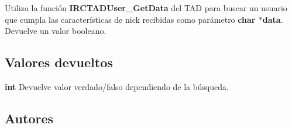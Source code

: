 Utiliza la función {\bfseries I\+R\+C\+T\+A\+D\+User\+\_\+\+Get\+Data} del T\+AD para buscar un usuario que cumpla las características de nick recibidas como parámetro {\bfseries char $\ast$data}. Devuelve un valor booleano.\hypertarget{server_users_find_by_nick_return_server_users_find_by_nick}{}\subsection{Valores devueltos}\label{server_users_find_by_nick_return_server_users_find_by_nick}

\begin{DoxyItemize}
\item {\bfseries int} Devuelve valor verdado/falso dependiendo de la búsqueda. 
\end{DoxyItemize}\hypertarget{server_users_find_by_nick_authors_server_users_find_by_nick}{}\subsection{Autores}\label{server_users_find_by_nick_authors_server_users_find_by_nick}

